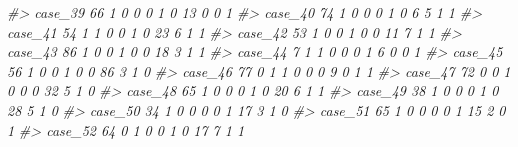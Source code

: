\documentclass[]{book}
\newenvironment{Shaded}{\begin{snugshade}}{\end{snugshade}}
\newcommand{\CommentTok}[1]{\textcolor[rgb]{0.56,0.35,0.01}{\textit{#1}}}
\begin{document}
\begin{Shaded}
\begin{Highlighting}[]
\CommentTok{#> case_39   66        1        0                0                 0                 1              0                    13                      0           0             1}
\CommentTok{#> case_40   74        1        0                0                 0                 1              0                     6                      5           1             1}
\CommentTok{#> case_41   54        1        1                0                 0                 1              0                    23                      6           1             1}
\CommentTok{#> case_42   53        1        0                0                 1                 0              0                    11                      7           1             1}
\CommentTok{#> case_43   86        1        0                0                 1                 0              0                    18                      3           1             1}
\CommentTok{#> case_44    7        1        1                0                 0                 0              1                     6                      0           0             1}
\CommentTok{#> case_45   56        1        0                0                 1                 0              0                    86                      3           1             0}
\CommentTok{#> case_46   77        0        1                1                 0                 0              0                     9                      0           1             1}
\CommentTok{#> case_47   72        0        0                1                 0                 0              0                    32                      5           1             0}
\CommentTok{#> case_48   65        1        0                0                 0                 1              0                    20                      6           1             1}
\CommentTok{#> case_49   38        1        0                0                 0                 1              0                    28                      5           1             0}
\CommentTok{#> case_50   34        1        0                0                 0                 0              1                    17                      3           1             0}
\CommentTok{#> case_51   65        1        0                0                 0                 0              1                    15                      2           0             1}
\CommentTok{#> case_52   64        0        1                0                 0                 1              0                    17                      7           1             1}

\end{Highlighting}
\end{Shaded}
\end{document}
